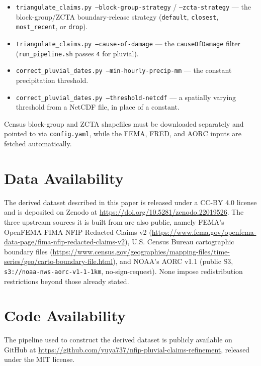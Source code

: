 \begin{itemize}
  \item \texttt{triangulate\_claims.py --block-group-strategy} /
    \texttt{--zcta-strategy} --- the block-group/ZCTA boundary-release
    strategy (\texttt{default}, \texttt{closest}, \texttt{most\_recent},
    or \texttt{drop}).
  \item \texttt{triangulate\_claims.py --cause-of-damage} --- the
    \texttt{causeOfDamage} filter (\texttt{run\_pipeline.sh} passes
    \texttt{4} for pluvial).
  \item \texttt{correct\_pluvial\_dates.py --min-hourly-precip-mm} ---
    the constant precipitation threshold.
  \item \texttt{correct\_pluvial\_dates.py --threshold-netcdf} ---
    a spatially varying threshold from a NetCDF file, in place of a
    constant.
\end{itemize}

Census block-group and ZCTA shapefiles must be downloaded separately
and pointed to via \texttt{config.yaml}, while the FEMA, FRED, and
AORC inputs are fetched automatically.

\section*{Data Availability}

The derived dataset described in this paper is released under a CC-BY
4.0 license and is deposited on Zenodo at
\url{https://doi.org/10.5281/zenodo.22019526}. The three upstream sources it is
built from are also public, namely FEMA's OpenFEMA FIMA NFIP Redacted Claims v2
(\url{https://www.fema.gov/openfema-data-page/fima-nfip-redacted-claims-v2}),
U.S. Census Bureau cartographic boundary files
(\url{https://www.census.gov/geographies/mapping-files/time-series/geo/carto-boundary-file.html}),
and NOAA's AORC v1.1 (public S3, \texttt{s3://noaa-nws-aorc-v1-1-1km},
no-sign-request). None impose redistribution restrictions beyond those
already stated.

\section*{Code Availability}

The pipeline used to construct the derived dataset is publicly available
on GitHub at \url{https://github.com/yuya737/nfip-pluvial-claims-refinement},
released under the MIT license.





